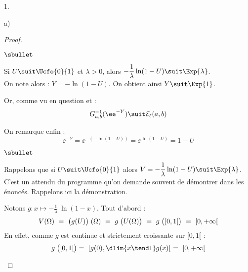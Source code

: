 \documentclass[11pt]{article}%
\begin{document}
\begin{noliste}{1.}
\begin{noliste}{a)}
    \begin{proof}~
      \begin{noliste}{$\sbullet$}
      \item Si $U \suit \Ucfo{0}{1}$ et $\lambda > 0$, alors $-
        \dfrac{1}{\lambda} \ln(1-U) \suit \Exp{\lambda}$.\\[.2cm]
        On note alors : $Y = - \ln(1-U)$. On obtient ainsi $Y \suit
        \Exp{1}$.

      \item Or, comme vu en question  et  :
        \[
        G^{-1}_{a, b}(\ee^{-Y}) \suit \mathcal{E}_\ell(a, b)
        \]

      \item On remarque enfin :
        \[
        \ee^{-Y} = \ee^{-(- \ln(1-U))} = \ee^{\ln(1-U)} = 1 - U
        \]       
      \end{noliste}
      
      
      \newpage
      
      
      \begin{remarkL}{.97}%
        \begin{noliste}{$\sbullet$}
        \item Rappelons que si $U \suit \Ucfo{0}{1}$ alors $V =
          -\dfrac{1}{\lambda} \ln(1-U) \suit \Exp{\lambda}$.\\
          C'est un attendu du programme qu'on demande souvent de
          démontrer dans les énoncés. Rappelons ici la démonstration.
        \item Notons $g : x \mapsto - \frac{1}{\lambda} \
          \ln(1-x)$. Tout d'abord :
          \[
          V(\Omega) \ = \ \big( g(U) \big) \hspace{.1cm} (\Omega)
          \ = \ g \hspace{.1cm} \big(U(\Omega) \big) \ = \ g
          \hspace{.1cm} \big( [0, 1[ \big) \ = \ [0, +\infty[
          \]
          En effet, comme $g$ est continue et strictement croissante
          sur $[0, 1[$ :
          \[
          g \hspace{.1cm} \big( [0, 1[ \big) = \ [g(0), \dlim{x \tend 1}
          g(x)[ \ = \ [0, +\infty[
          \]
          

\end{noliste}
\end{remarkL}
\end{proof}
\end{noliste}
\end{noliste}
\end{document}
